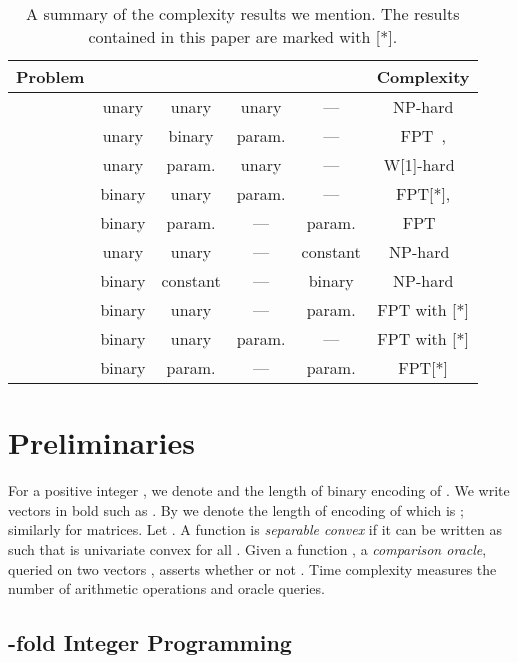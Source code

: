 \documentclass{llncs}
\newcommand{\FPT}{{\sf FPT}\xspace}
\newcommand{\NP}{{\sf NP}\xspace}
\newcommand{\W}[1]{{\sf W}[#1]\xspace}
\begin{document}
\begin{table*}
\def\arraystretch{1.1}
\centering
\begin{tabular}{| c | cccc | c |}
\hline
Problem &  &  &  &  & Complexity \\
\hline\hline
\multirow{3}{*}{} &
unary & unary & unary & --- & \NP-hard \cite{JansenKMS:13} \\
& unary & binary & param. & --- & \FPT~\cite{MnichW:14},  \\
& unary & param. & unary & --- & \W{1}-hard~\cite{JansenKMS:13} \\
\hline
 & binary & unary & param. & --- & \FPT [*],  \\
\hline
\multirow{4}{*}{} & binary & param. & --- & param. & \FPT~\cite{MnichW:14} \\
& unary & unary & --- & constant & \NP-hard~\cite{AsahiroJMOZ:07} \\
& binary & constant & --- & binary & \NP-hard \\
& binary & unary & --- & param. & \FPT with  [*] \\
\hline
\multirow{2}{*}{}
& binary & unary & param. & --- & \FPT with  [*] \\
& binary & param. & --- & param. & \FPT [*] \\
\hline
\end{tabular}
 \caption{A summary of the complexity results we mention. The results contained in this paper are marked with [*].}\label{tab:ComplexityOverview}
\end{table*}

\section{Preliminaries}

For a positive integer , we denote  and  the length of binary encoding of . We write vectors in bold such as . By  we denote the length of encoding of  which is ; similarly for matrices. Let . A function  is \textit{separable convex} if it can be written as  such that  is univariate convex for all . Given a function , a \textit{comparison oracle}, queried on two vectors , asserts whether or not  . Time complexity measures the number of arithmetic operations and oracle queries.


\subsection{-fold Integer Programming}
\label{sec:nfoldip}
\end{document}
